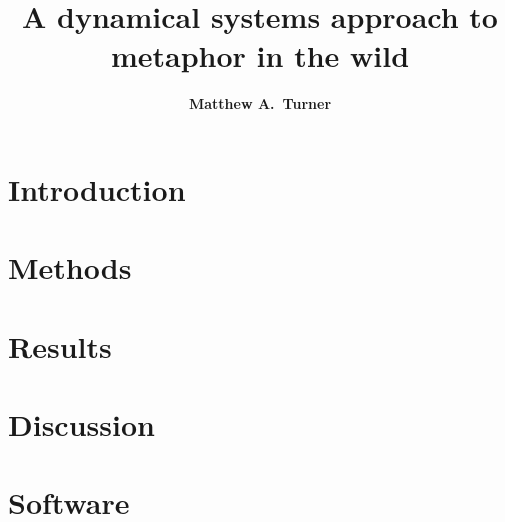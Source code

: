 \documentclass[11pt,letterpaper]{article}
\title{A dynamical systems approach to metaphor in the wild}
\author{{\large \bf Matthew A.~Turner}}
\begin{document}
\maketitle


% 

\section{Introduction}


\section{Methods}
\label{sec:Methods}


\section{Results}
\label{sec:Results}


\section{Discussion}





\setlength{\bibleftmargin}{.125in}
\setlength{\bibindent}{-\bibleftmargin}



\appendix

\section{Software}

\end{document}
